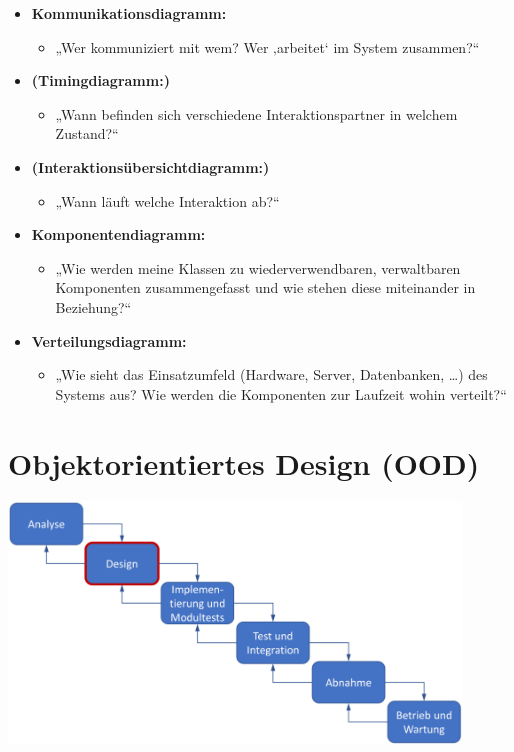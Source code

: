 \documentclass[11pt, a4paper]{article}
\begin{document}
\begin{itemize}
\begin{itemize}
    \end{itemize}
    \item \textbf{Kommunikationsdiagramm:}
    \begin{itemize}
        \item „Wer kommuniziert mit wem? Wer ‚arbeitet‘ im System zusammen?“
    \end{itemize}
    \item \textbf{(Timingdiagramm:)}
    \begin{itemize}
        \item „Wann befinden sich verschiedene Interaktionspartner in welchem Zustand?“
    \end{itemize}
    \item \textbf{(Interaktionsübersichtdiagramm:)}
    \begin{itemize}
        \item „Wann läuft welche Interaktion ab?“
    \end{itemize}
    \item \textbf{Komponentendiagramm:}
    \begin{itemize}
        \item „Wie werden meine Klassen zu wiederverwendbaren, verwaltbaren Komponenten zusammengefasst und wie stehen diese miteinander in Beziehung?“
    \end{itemize}
    \item \textbf{Verteilungsdiagramm:}
    \begin{itemize}
        \item „Wie sieht das Einsatzumfeld (Hardware, Server, Datenbanken, …) des Systems aus? Wie werden die Komponenten zur Laufzeit wohin verteilt?“
    \end{itemize}
\end{itemize}



\section{Objektorientiertes Design (OOD)} %

\centering \includegraphics[width=0.9\textwidth]{OOD-00.png}
\end{document}
